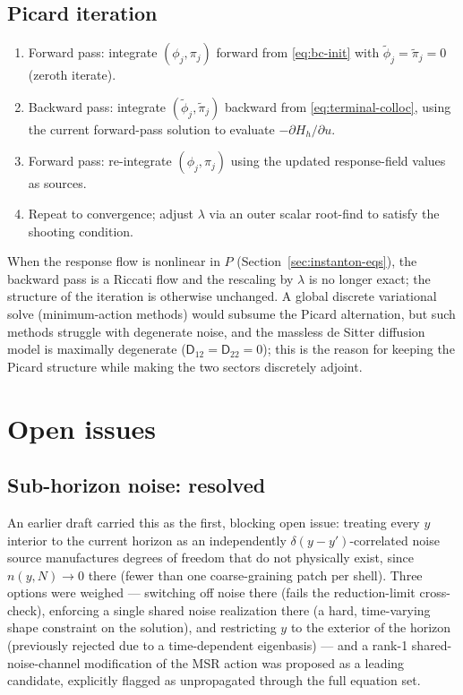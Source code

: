\documentclass[a4paper,11pt]{article}
\newcommand{\Ny}{N}                          %
\newcommand{\field}{\phi}                    %
\newcommand{\mom}{\pi}                       %
\newcommand{\rfield}{\widetilde\field}       %
\newcommand{\rmom}{\widetilde\mom}           %
\newcommand{\yco}{y}                         %
\newcommand{\Dcm}[1]{\mathsf{D}_{#1}}        %
\newcommand{\ncount}{n}                      %
\newcommand{\Hh}{H_h}                         %
\newcommand{\lag}{\lambda}                   %
\begin{document}
\subsection{Picard iteration}

\begin{enumerate}
    \item Forward pass: integrate $(\field_j,\mom_j)$ forward from
    \eqref{eq:bc-init} with $\rfield_j=\rmom_j=0$ (zeroth iterate).
    \item Backward pass: integrate $(\rfield_j,\rmom_j)$ backward from
    \eqref{eq:terminal-colloc}, using the current forward-pass solution to
    evaluate $-\partial\Hh/\partial u$.
    \item Forward pass: re-integrate $(\field_j,\mom_j)$ using the
    updated response-field values as sources.
    \item Repeat to convergence; adjust $\lag$ via an outer scalar
    root-find to satisfy the shooting condition.
\end{enumerate}
When the response flow is nonlinear in $P$ (Section~\ref{sec:instanton-eqs}),
the backward pass is a Riccati flow and the rescaling by $\lag$ is no
longer exact; the structure of the iteration is otherwise unchanged. A
global discrete variational solve (minimum-action methods) would subsume
the Picard alternation, but such methods struggle with degenerate noise,
and the massless de Sitter diffusion model is maximally degenerate
($\Dcm{12}=\Dcm{22}=0$); this is the reason for keeping the Picard
structure while making the two sectors discretely adjoint.
\section{Open issues}
\label{sec:open-issues}

\subsection{Sub-horizon noise: resolved}

An earlier draft carried this as the first, blocking open issue: treating
every $\yco$ interior to the current horizon as an independently
$\delta(\yco-\yco')$-correlated noise source manufactures degrees of
freedom that do not physically exist, since $\ncount(\yco,\Ny)\to0$ there
(fewer than one coarse-graining patch per shell). Three options were
weighed --- switching off noise there (fails the reduction-limit
cross-check), enforcing a single shared noise realization there (a hard,
time-varying shape constraint on the solution), and restricting $\yco$ to
the exterior of the horizon (previously rejected due to a
time-dependent eigenbasis) --- and a rank-1 shared-noise-channel
modification of the MSR action was proposed as a leading candidate,
explicitly flagged as unpropagated through the full equation set.
\end{document}
